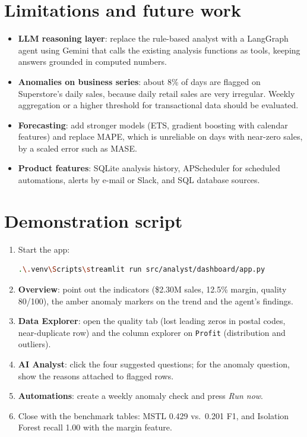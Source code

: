 \documentclass[11pt,a4paper]{article}
\newcommand{\code}[1]{\texttt{#1}}
\begin{document}
\section{Limitations and future work}\label{sec:future}

\begin{itemize}
  \item \textbf{LLM reasoning layer}: replace the rule-based analyst with a LangGraph agent using Gemini that
        calls the existing analysis functions as tools, keeping answers grounded in computed numbers.
  \item \textbf{Anomalies on business series}: about 8\% of days are flagged on Superstore's daily sales,
        because daily retail sales are very irregular. Weekly aggregation or a higher threshold for transactional
        data should be evaluated.
  \item \textbf{Forecasting}: add stronger models (ETS, gradient boosting with calendar features) and replace
        MAPE, which is unreliable on days with near-zero sales, by a scaled error such as MASE.
  \item \textbf{Product features}: SQLite analysis history, APScheduler for scheduled automations, alerts by
        e-mail or Slack, and SQL database sources.
\end{itemize}

\section{Demonstration script}

\begin{enumerate}
  \item Start the app:
\begin{lstlisting}[language=bash]
.\.venv\Scripts\streamlit run src/analyst/dashboard/app.py
\end{lstlisting}
  \item \textbf{Overview}: point out the indicators (\$2.30M sales, 12.5\% margin, quality 80/100), the amber
        anomaly markers on the trend and the agent's findings.
  \item \textbf{Data Explorer}: open the quality tab (lost leading zeros in postal codes, near-duplicate row) and the
        column explorer on \code{Profit} (distribution and outliers).
  \item \textbf{AI Analyst}: click the four suggested questions; for the anomaly question, show the reasons
        attached to flagged rows.
  \item \textbf{Automations}: create a weekly anomaly check and press \emph{Run now}.
  \item Close with the benchmark tables: MSTL 0.429 vs.\ 0.201 F1, and Isolation Forest recall 1.00 with the
        margin feature.
\end{enumerate}
\end{document}
